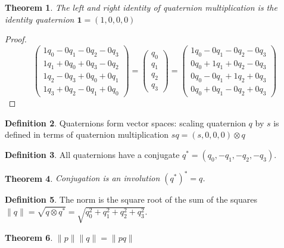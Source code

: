 \documentclass{amsart}
\newtheorem{theorem}{Theorem}[section]
\theoremstyle{definition}
\newtheorem{definition}[theorem]{Definition}
\theoremstyle{remark}
\numberwithin{equation}{section}
\begin{document}
\begin{theorem}
  The left and right identity of quaternion multiplication is the \emph{identity quaternion} $\mathbf{1}=(1,0,0,0)$
\end{theorem}
\begin{proof}
  \begin{equation}
    \begin{pmatrix}
      1q_0 - 0q_1 - 0q_2 - 0q_3 \\
      1q_1 + 0q_0 + 0q_3 - 0q_2 \\
      1q_2 - 0q_3 + 0q_0 + 0q_1 \\
      1q_3 + 0q_2 - 0q_1 + 0q_0
    \end{pmatrix} =
    \begin{pmatrix}
      q_0 \\
      q_1 \\
      q_2 \\
      q_3
    \end{pmatrix} =  
    \begin{pmatrix}
      1q_0 - 0q_1 - 0q_2 - 0q_3 \\
      0q_0 + 1q_1 + 0q_2 - 0q_3 \\
      0q_0 - 0q_1 + 1q_2 + 0q_3 \\
      0q_0 + 0q_1 - 0q_2 + 0q_3
    \end{pmatrix}
  \end{equation}
\end{proof}

\begin{definition}
  Quaternions form vector spaces: scaling quaternion $q$ by $s$ is defined in terms of quaternion multiplication $sq = (s,0,0,0)\otimes q$
\end{definition}

\begin{definition}
  All quaternions have a conjugate $q^*=(q_0,-q_1,-q_2,-q_3)$. 
\end{definition}

\begin{theorem}
  Conjugation is an involution $(q^*)^*=q$.
\end{theorem}

\begin{definition}
  The norm is the square root of the sum of the squares $\|q\|=\sqrt{q\otimes q^*}=\sqrt{q_0^2+q_1^2+q_2^2+q_3^2}$.
\end{definition}

\begin{theorem}
  $\|p\|\|q\|=\|pq\|$
\end{theorem}
\end{document}
